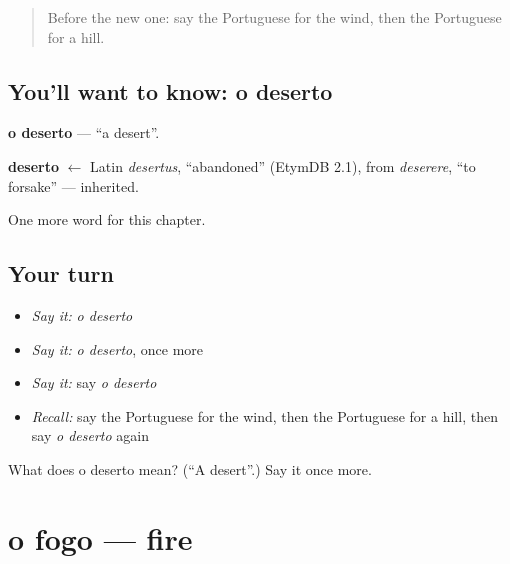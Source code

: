 \label{lesson:PT-C59-deserto}



\begin{quote}
Before the new one: say the Portuguese for the wind, then the Portuguese for a hill.
\end{quote}

\subsection*{You'll want to know: o deserto}
\textbf{o deserto} — \textquotedblleft{}a desert\textquotedblright{}.

\begin{cousinweb}
\textbf{deserto} $\leftarrow$ Latin \emph{desertus}, \textquotedblleft{}abandoned\textquotedblright{} (EtymDB 2.1), from \emph{deserere}, \textquotedblleft{}to forsake\textquotedblright{} — inherited.
\end{cousinweb}

\begin{grammarlens}[title={What you've built}]
One more word for this chapter.
\end{grammarlens}

\subsection*{Your turn}
\begin{itemize}
\raggedright
  \item \emph{Say it:} \emph{o deserto}
  \item \emph{Say it:} \emph{o deserto}, once more
  \item \emph{Say it:} say \emph{o deserto}
  \item \emph{Recall:} say the Portuguese for the wind, then the Portuguese for a hill, then say \emph{o deserto} again
\end{itemize}

\begin{tcolorbox}[breakable,colback=teal!4,colframe=teal!35!black,title={Before you move on}]
What does o deserto mean? (\textquotedblleft{}A desert\textquotedblright{}.) Say it once more.
\end{tcolorbox}
\section[o fogo]{o fogo — fire}

\label{lesson:PT-C59-fogo}



